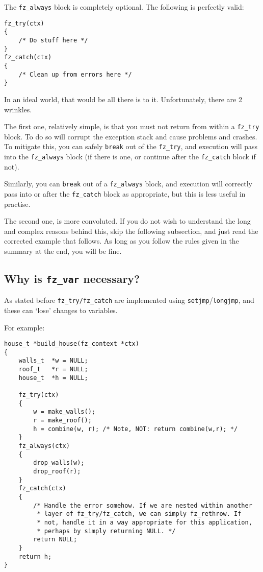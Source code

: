 \documentclass[oneside]{book}
\begin{document}
The \texttt{fz\_always} block is completely optional. The following is perfectly valid:

\begin{lstlisting}
fz_try(ctx)
{
    /* Do stuff here */
}
fz_catch(ctx)
{
    /* Clean up from errors here */
}
\end{lstlisting}

In an ideal world, that would be all there is to it. Unfortunately, there are 2 wrinkles.

The first one, relatively simple, is that you must not return from within a \texttt{fz\_try} block. To do so will corrupt the exception stack and cause problems and crashes. To mitigate this, you can safely \texttt{break} out of the \texttt{fz\_try}, and execution will pass into the \texttt{fz\_always} block (if there is one, or continue after the \texttt{fz\_catch} block if not).

Similarly, you can \texttt{break} out of a \texttt{fz\_always} block, and execution will correctly pass into or after the \texttt{fz\_catch} block as appropriate, but this is less useful in practise.

The second one, is more convoluted. If you do not wish to understand the long and complex reasons behind this, skip the following subsection, and just read the corrected example that follows. As long as you follow the rules given in the summary at the end, you will be fine.

\subsection{Why is \texttt{fz\_var} necessary?}

As stated before \texttt{fz\_try\slash}\texttt{fz\_catch} are implemented using \texttt{setjmp}\slash \texttt{longjmp}, and these can `lose' changes to variables.

For example:

\begin{lstlisting}
house_t *build_house(fz_context *ctx)
{
    walls_t  *w = NULL;
    roof_t   *r = NULL;
    house_t  *h = NULL;

    fz_try(ctx)
    {
        w = make_walls();
        r = make_roof();
        h = combine(w, r); /* Note, NOT: return combine(w,r); */
    }
    fz_always(ctx)
    {
        drop_walls(w);
        drop_roof(r);
    }
    fz_catch(ctx)
    {
        /* Handle the error somehow. If we are nested within another
         * layer of fz_try/fz_catch, we can simply fz_rethrow. If
         * not, handle it in a way appropriate for this application,
         * perhaps by simply returning NULL. */
        return NULL;
    }
    return h;
}
\end{lstlisting}
\end{document}
